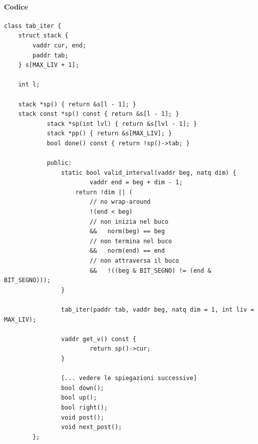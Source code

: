 \documentclass[11pt]{report}
\theoremstyle{definition}
\begin{document}
\paragraph{Codice}
\small
\begin{verbatim}
class tab_iter {
    struct stack {
        vaddr cur, end;
        paddr tab;
    } s[MAX_LIV + 1];
		
    int l;
		
    stack *sp() { return &s[l - 1]; }
    stack const *sp() const { return &s[l - 1]; }
		    stack *sp(int lvl) { return &s[lvl - 1]; }
		    stack *pp() { return &s[MAX_LIV]; }
		    bool done() const { return !sp()->tab; }
		
		    public:
		        static bool valid_interval(vaddr beg, natq dim) {
			            vaddr end = beg + dim - 1;
		            return !dim || (
			            // no wrap-around
			            !(end < beg)
			            // non inizia nel buco
			            &&   norm(beg) == beg
			            // non termina nel buco
			            &&   norm(end) == end
			            // non attraversa il buco
			            &&   !((beg & BIT_SEGNO) != (end & BIT_SEGNO)));
		        }
		
		        tab_iter(paddr tab, vaddr beg, natq dim = 1, int liv = MAX_LIV);
		
		        vaddr get_v() const {
			            return sp()->cur;
		        }
		
		        [... vedere le spiegazioni successive]
		        bool down();
		        bool up();
		        bool right();
		        void post();
		        void next_post();
	    };
\end{verbatim} 
\normalsize
\end{document}
